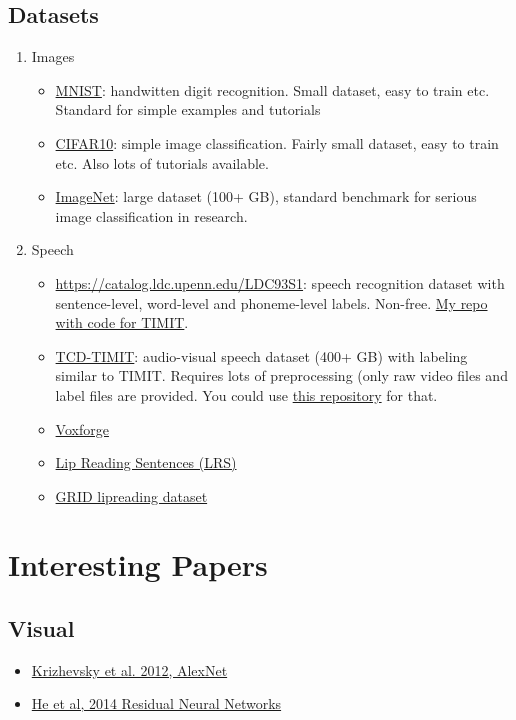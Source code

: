 \documentclass[]{article}
\begin{document}
\subsection{Datasets}
\begin{enumerate}
	\item{Images}
	\begin{itemize}
		\item \href{http://yann.lecun.com/exdb/mnist/}{MNIST}: handwitten digit recognition. Small dataset, easy to train etc. Standard for simple examples and tutorials
		\item \href{https://www.cs.toronto.edu/~kriz/cifar.html}{CIFAR10}: simple image classification. Fairly small dataset, easy to train etc. Also lots of tutorials available.
		\item \href{http://www.image-net.org/}{ImageNet}: large dataset (100+ GB), standard benchmark for serious image classification in research. 
	\end{itemize}
	\item{Speech}
	\begin{itemize}
		\item \href{TIMIT}{https://catalog.ldc.upenn.edu/LDC93S1}: speech recognition dataset with sentence-level, word-level and phoneme-level labels. Non-free. \href{https://github.com/matthijsvk/TIMITspeech}{My repo with code for TIMIT}.
		\item \href{https://sigmedia.tcd.ie/TCDTIMIT/}{TCD-TIMIT}: audio-visual speech dataset (400+ GB) with labeling similar to TIMIT. Requires lots of preprocessing (only raw video files and label files are provided. You could use \href{https://github.com/matthijsvk/TCDTIMITprocessing}{this repository} for that.
		\item \href{http://www.voxforge.org/}{Voxforge}
		\item \href{http://www.robots.ox.ac.uk/~vgg/data/lip_reading_sentences/}{Lip Reading Sentences (LRS)}
		\item \href{http://spandh.dcs.shef.ac.uk/gridcorpus/}{GRID lipreading dataset}
	\end{itemize}
\end{enumerate}

\pagebreak
\section{Interesting Papers}

\subsection{Visual}
\begin{itemize}
	\item \href{http://papers.nips.cc/paper/4824-imagenet-classification-with-deep-convolutional-neural-networks}{Krizhevsky et al. 2012, AlexNet}
	\item \href{https://www.cv-foundation.org/openaccess/content_cvpr_2016/html/He_Deep_Residual_Learning_CVPR_2016_paper.html}{He et al, 2014 Residual Neural Networks}
\end{itemize}
	
\end{document}
